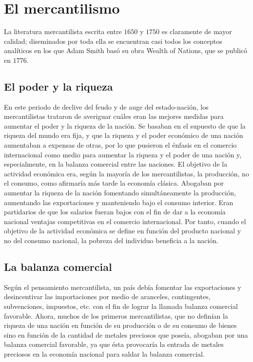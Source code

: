 \documentclass[10pt]{book}
\begin{document}
\section{El mercantilismo}
La literatura mercantilista escrita entre $1650$ y $1750$ es claramente de mayor calidad; diseminados por toda ella se encuentran casi todos los conceptos analíticos en los que Adam Smith basó su obra Wealth of Nations, que se publicó en $1776$.

\subsection{El poder y la riqueza}
En este periodo de declive del feudo y de auge del estado-nación, los mercantilistas trataron de averiguar cuáles eran las mejores medidas para aumentar el poder y la riqueza de la nación. Se basaban en el supuesto de que la riqueza del mundo era fija, y que la riqueza y el poder económico de una nación aumentaban a expensas de otras, por lo que pusieron el énfasis en el comercio internacional como medio para aumentar la riqueza y el poder de una nación y, especialmente, en la balanza comercial entre las naciones. El objetivo de la actividad económica era, según la mayoría de los mercantilistas, la producción, no el consumo, como afirmaría más tarde la economía clásica. Abogaban por aumentar la riqueza de la nación fomentando simultáneamente la producción, aumentando las exportaciones y manteniendo bajo el consumo interior. Eran partidarios de que los salarios fueran bajos con el fin de dar a la economía nacional ventajas competitivas en el comercio internacional. Por tanto, cuando el objetivo de la actividad económica se define en función del producto nacional y no del consumo nacional, la pobreza del individuo beneficia a la nación.

\subsection{La balanza comercial}
Según el pensamiento mercantilista, un país debía fomentar las exportaciones y desincentivar las importaciones por medio de aranceles, contingentes, subvenciones, impuestos, etc. con el fin de lograr la llamada balanza comercial favorable. Ahora, muchos de los primeros mercantilistas, que no definían la riqueza de una nación en función de su producción o de su consumo de bienes sino en función de la cantidad de metales preciosos que poseía, abogaban por una balanza comercial favorable, ya que ésta provocaría la entrada de metales preciosos en la economía nacional para saldar la balanza comercial.
\end{document}
